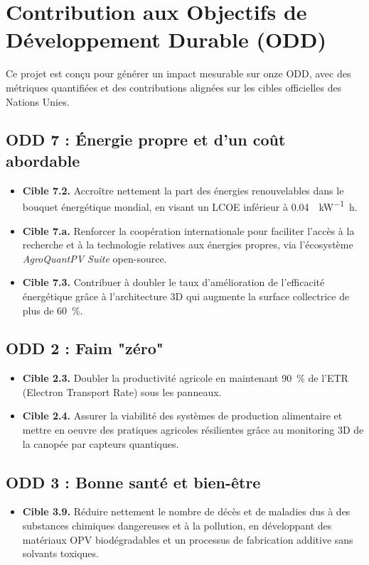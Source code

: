 \documentclass[12pt, a4paper]{article}
\begin{document}
\section{Contribution aux Objectifs de Développement Durable (ODD)}

Ce projet est conçu pour générer un impact mesurable sur onze ODD, avec des métriques quantifiées et des contributions alignées sur les cibles officielles des Nations Unies.

\subsection{ODD 7 : Énergie propre et d'un coût abordable}
\begin{itemize}
    \item \textbf{Cible 7.2.} Accroître nettement la part des énergies renouvelables dans le bouquet énergétique mondial, en visant un LCOE inférieur à \SI{0.04}{\dollar\per\kilo\watt\hour}.

    \item \textbf{Cible 7.a.} Renforcer la coopération internationale pour faciliter l'accès à la recherche et à la technologie relatives aux énergies propres, via l'écosystème \textit{AgroQuantPV Suite} open-source.

    \item \textbf{Cible 7.3.} Contribuer à doubler le taux d'amélioration de l'efficacité énergétique grâce à l'architecture 3D qui augmente la surface collectrice de plus de \SI{60}{\percent}.
\end{itemize}

\subsection{ODD 2 : Faim "zéro"}
\begin{itemize}
    \item \textbf{Cible 2.3.} Doubler la productivité agricole en maintenant \SI{90}{\percent} de l'ETR (Electron Transport Rate) sous les panneaux.

    \item \textbf{Cible 2.4.} Assurer la viabilité des systèmes de production alimentaire et mettre en oeuvre des pratiques agricoles résilientes grâce au monitoring 3D de la canopée par capteurs quantiques.
\end{itemize}

\subsection{ODD 3 : Bonne santé et bien-être}
\begin{itemize}
    \item \textbf{Cible 3.9.} Réduire nettement le nombre de décès et de maladies dus à des substances chimiques dangereuses et à la pollution, en développant des matériaux OPV biodégradables et un processus de fabrication additive sans solvants toxiques.
\end{itemize}
\end{document}
